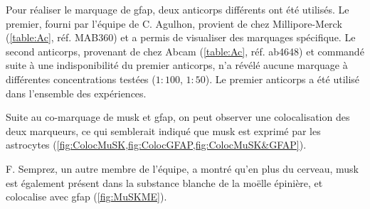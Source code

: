 	Pour réaliser le marquage de \gls{gfap}, deux anticorps différents ont été utilisés. Le premier, fourni par l'équipe de C. Agulhon, provient de chez Millipore-Merck (\cref{table:Ac}, réf. MAB360) et a permis de visualiser des marquages spécifique. Le second anticorps, provenant de chez Abcam (\cref{table:Ac}, réf. ab4648) et commandé suite à une indisponibilité du premier anticorps, n'a révélé aucune marquage à différentes concentrations testées ($1{:}100$, $1{:}50$). Le premier anticorps a été utilisé dans l'ensemble des expériences.
	
	Suite au co-marquage de \gls{musk} et \gls{gfap}, on peut observer une colocalisation des deux marqueurs, ce qui semblerait indiqué que \gls{musk} est exprimé par les astrocytes (\cref{fig:ColocMuSK,fig:ColocGFAP,fig:ColocMuSK&GFAP}). 
	
	F. Semprez, un autre membre de l'équipe, a montré qu'en plus du cerveau, \gls{musk} est également présent dans la substance blanche de la moëlle épinière, et colocalise avec \gls{gfap} (\cref{fig:MuSKME}).
	
